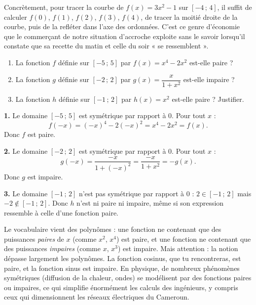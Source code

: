 \documentclass[11pt]{article}
\begin{document}
Concrètement, pour tracer la courbe de $f(x) = 3x^2 - 1$ sur $[-4\,;\,4]$, il suffit de calculer $f(0)$, $f(1)$, $f(2)$, $f(3)$, $f(4)$, de tracer la moitié droite de la courbe, puis de la refléter dans l'axe des ordonnées. C'est ce genre d'économie que le commerçant de notre situation d'accroche exploite sans le savoir lorsqu'il constate que sa recette du matin et celle du soir « se ressemblent ».

\begin{exercice}
\begin{enumerate}
\item La fonction $f$ définie sur $[-5\,;\,5]$ par $f(x) = x^4 - 2x^2$ est-elle paire ?
\item La fonction $g$ définie sur $[-2\,;\,2]$ par $g(x) = \dfrac{x}{1+x^2}$ est-elle impaire ?
\item La fonction $h$ définie sur $[-1\,;\,2]$ par $h(x) = x^2$ est-elle paire ? Justifier.
\end{enumerate}
\end{exercice}

\begin{corrige}
\textbf{1.} Le domaine $[-5\,;\,5]$ est symétrique par rapport à $0$. Pour tout $x$ :
\[ f(-x) = (-x)^4 - 2(-x)^2 = x^4 - 2x^2 = f(x). \]
Donc $f$ est paire.

\textbf{2.} Le domaine $[-2\,;\,2]$ est symétrique par rapport à $0$. Pour tout $x$ :
\[ g(-x) = \frac{-x}{1+(-x)^2} = \frac{-x}{1+x^2} = -g(x). \]
Donc $g$ est impaire.

\textbf{3.} Le domaine $[-1\,;\,2]$ n'est pas symétrique par rapport à $0$ : $2 \in [-1\,;\,2]$ mais $-2 \notin [-1\,;\,2]$. Donc $h$ n'est ni paire ni impaire, même si son expression ressemble à celle d'une fonction paire.
\end{corrige}

\begin{savaistu}
Le vocabulaire vient des polynômes : une fonction ne contenant que des puissances \emph{paires} de $x$ (comme $x^2$, $x^4$) est paire, et une fonction ne contenant que des puissances \emph{impaires} (comme $x$, $x^3$) est impaire. Mais attention : la notion dépasse largement les polynômes. La fonction cosinus, que tu rencontreras, est paire, et la fonction sinus est impaire. En physique, de nombreux phénomènes symétriques (diffusion de la chaleur, ondes) se modélisent par des fonctions paires ou impaires, ce qui simplifie énormément les calculs des ingénieurs, y compris ceux qui dimensionnent les réseaux électriques du Cameroun.
\end{savaistu}
\end{document}
